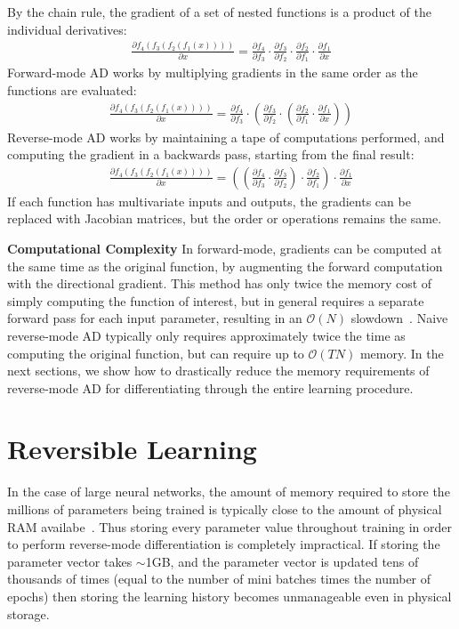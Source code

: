 \documentclass{article}
\newcommand{\pderiv}[2]{\frac{\partial #1}{\partial #2}}
\newcommand{\numhypers}{N}
\newcommand{\numsteps}{T}
\begin{document}
By the chain rule, the gradient of a set of nested functions is a product of the individual derivatives:
%
\begin{align*}
\pderiv{f_4(f_3(f_2(f_1(x))))}{x} = \pderiv{f_4}{f_3} \cdot \pderiv{f_3}{f_2} \cdot \pderiv{f_2}{f_1} \cdot \pderiv{f_1}{x}
\end{align*}
%
Forward-mode AD works by multiplying gradients in the same order as the functions are evaluated:
%
\begin{align*}
\pderiv{f_4(f_3(f_2(f_1(x))))}{x} = \pderiv{f_4}{f_3} \cdot \left( \pderiv{f_3}{f_2} \cdot \left( \pderiv{f_2}{f_1} \cdot \pderiv{f_1}{x} \right) \right)
\end{align*}
%
Reverse-mode AD works by maintaining a tape of computations performed, and computing the gradient in a backwards pass, starting from the final result:
%
\begin{align*}
\pderiv{f_4(f_3(f_2(f_1(x))))}{x} = \left(  \left(  \pderiv{f_4}{f_3} \cdot \pderiv{f_3}{f_2} \right) \cdot \pderiv{f_2}{f_1} \right) \cdot \pderiv{f_1}{x} 
\end{align*}
%
If each function has multivariate inputs and outputs, the gradients can be replaced with Jacobian matrices, but the order or operations remains the same.

\textbf{Computational Complexity}
In forward-mode, gradients can be computed at the same time as the original function, by augmenting the forward computation with the directional gradient.
This method has only twice the memory cost of simply computing the function of interest, but in general requires a separate forward pass for each input parameter, resulting in an $\mathcal{O}(\numhypers)$ slowdown~\cite{pearlmutter2008reverse}.
Naive reverse-mode AD typically only requires approximately twice the time as computing the original function, but can require up to $\mathcal{O}(\numsteps\numhypers)$ memory.
In the next sections, we show how to drastically reduce the memory requirements of reverse-mode AD for differentiating through the entire learning procedure.

\section{Reversible Learning}

In the case of large neural networks, the amount of memory required to store the millions of parameters being trained is typically close to the amount of physical RAM availabe~\cite{sequence2014}.
Thus storing every parameter value throughout training in order to perform reverse-mode differentiation is completely impractical.
If storing the parameter vector takes $\sim$1GB, and the parameter vector is updated tens of thousands of times (equal to the number of mini batches times the number of epochs) then storing the learning history becomes unmanageable even in physical storage.
\end{document}
